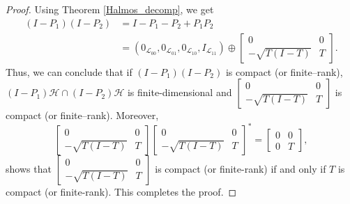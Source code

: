 \documentclass[10pt,a4paper]{amsart}
\newcommand{\clh}{\mathcal{H}}
\newcommand{\cll}{\mathcal{L}}
\begin{document}
\begin{proof}
Using Theorem \ref{Halmos_decomp}, we get
       \begin{equation*} 
 	\begin{split}
       (I-P_1)(I-P_2)
        &=I-P_1-P_2+P_1P_2\\
        &=(0_{\cll_{00}},0_{\cll_{01}},0_{\cll_{10}},I_{\cll_{11}})\oplus \begin{bmatrix}
            0 & 0\\
            -\sqrt{T(I_{}-T)} & T
        \end{bmatrix}.
        \end{split}
       \end{equation*}
Thus, we can conclude that if $(I - P_1)(I - P_2)$ is compact (or finite--rank), $(I - P_1) \clh \cap (I - P_2)\clh$ is finite-dimensional and $\begin{bmatrix}
            0 & 0\\
            -\sqrt{T(I-T)} & T
        \end{bmatrix}$ is compact (or finite--rank). Moreover,
         \[
        \begin{bmatrix}
            0 & 0\\
            -\sqrt{T(I-T)} & T
        \end{bmatrix}\begin{bmatrix}
            0 & 0\\
            -\sqrt{T(I-T)} & T
        \end{bmatrix}^*=\begin{bmatrix}
            0 & 0\\
            0 & T
        \end{bmatrix},
\] 
shows that $\begin{bmatrix}
            0 & 0\\
            -\sqrt{T(I-T)} & T
        \end{bmatrix}$ is compact (or finite-rank) if and only if $T$ is compact (or finite-rank). This completes the proof.
\end{proof}
\end{document}
